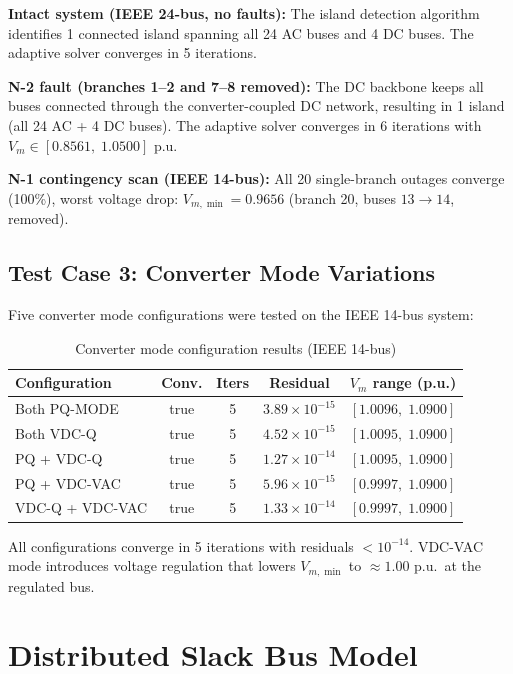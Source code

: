 \documentclass[11pt]{article}
\def\_{-}%
\begin{document}
\textbf{Intact system (IEEE 24-bus, no faults):} The island detection algorithm identifies 1 connected island spanning all 24 AC buses and 4 DC buses. The adaptive solver converges in 5 iterations.

\textbf{N-2 fault (branches 1--2 and 7--8 removed):} The DC backbone keeps all buses connected through the converter-coupled DC network, resulting in 1 island (all 24 AC + 4 DC buses). The adaptive solver converges in 6 iterations with $V_m \in [0.8561,\; 1.0500]$ p.u.

\textbf{N-1 contingency scan (IEEE 14-bus):} All 20 single-branch outages converge (100\%), worst voltage drop: $V_{m,\min} = 0.9656$ (branch 20, buses $13 \to 14$, removed).

\subsection{Test Case 3: Converter Mode Variations}

Five converter mode configurations were tested on the IEEE 14-bus system:

\begin{table}[h]
\centering
\caption{Converter mode configuration results (IEEE 14-bus)}
\label{tab:converter_modes}
\begin{tabular}{l c c c c}
\toprule
Configuration & Conv. & Iters & Residual & $V_m$ range (p.u.) \\
\midrule
Both PQ\_MODE          & true & 5 & $3.89 \times 10^{-15}$ & $[1.0096,\; 1.0900]$ \\
Both VDC\_Q            & true & 5 & $4.52 \times 10^{-15}$ & $[1.0095,\; 1.0900]$ \\
PQ + VDC\_Q            & true & 5 & $1.27 \times 10^{-14}$ & $[1.0095,\; 1.0900]$ \\
PQ + VDC\_VAC          & true & 5 & $5.96 \times 10^{-15}$ & $[0.9997,\; 1.0900]$ \\
VDC\_Q + VDC\_VAC      & true & 5 & $1.33 \times 10^{-14}$ & $[0.9997,\; 1.0900]$ \\
\bottomrule
\end{tabular}
\end{table}

All configurations converge in 5 iterations with residuals $< 10^{-14}$. VDC\_VAC mode introduces voltage regulation that lowers $V_{m,\min}$ to $\approx 1.00$ p.u.\ at the regulated bus.

\section{Distributed Slack Bus Model}
\end{document}
